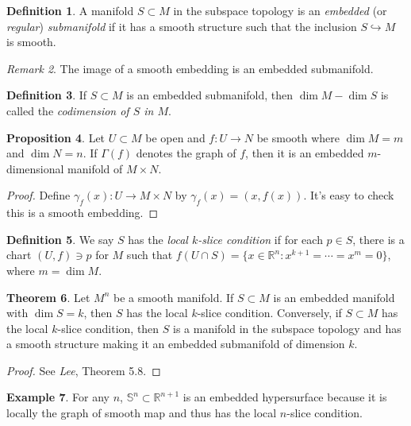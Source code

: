 \documentclass[10pt,letterpaper,cm]{nupset}
\theoremstyle{definition}
\newtheorem{definition}{Definition}[subsection]
\newtheorem{exmp}[definition]{Example}
\theoremstyle{theorem}
\newtheorem{theorem}[definition]{Theorem}
\newtheorem{prop}[definition]{Proposition}
\theoremstyle{remark}
\newtheorem{remark}[definition]{Remark}
\newcommand{\R}{\mathbb R}
\renewcommand{\S}{\mathbb S}
\newcommand{\1}{\mathbf{1}}
\newcommand{\0}{\vec 0}
\begin{document}
\begin{definition}
A manifold $ S\subset M$ in the subspace topology is an \textit{embedded} (or \textit{regular}) \textit{submanifold} if it has a smooth structure such that the inclusion $S \hookrightarrow M$ is smooth.
\end{definition}

\begin{remark}
The image of a smooth embedding is an embedded submanifold.
\end{remark}

\begin{definition}
If $S \subset M$ is an embedded submanifold, then $\dim M - \dim S$ is called the \textit{codimension of $S$ in $M$}.
\end{definition}

\begin{prop}
Let $U \subset M$ be open and $f: U \to N$ be smooth where $\dim M = m$ and $\dim N = n$. If $\Gamma(f)$ denotes the graph of $f$, then it is an embedded $m$-dimensional manifold of $M \times N$.
\end{prop}
\begin{proof}
Define $\gamma_f(x) : U \to M \times N$ by $\gamma_f(x) = (x, f(x))$. It's easy to check this is a smooth embedding.
\end{proof}

\begin{definition}
We say $S$ has the \textit{local $k$-slice condition} if for each $p\in S$, there is a chart $(U, f)\ni p$ for $M$ such that $f(U \cap S) = \{x\in \R^n : x^{k+1} = \cdots = x^m = 0\}$, where $m = \dim M$.
\end{definition}

\begin{theorem}\label{slice}
Let $M^n$ be a smooth manifold. If $S\subset M$ is an embedded manifold with $\dim S = k$, then $S$ has the local $k$-slice condition. Conversely, if $S\subset M$ has the local $k$-slice condition, then $S$ is a manifold in the subspace topology and has a smooth structure making it an embedded submanifold of dimension $k$.
\end{theorem}
\begin{proof}
See \textit{Lee}, Theorem 5.8.
\end{proof}

\begin{exmp}
For any $n$, $\S^n \subset \R^{n+1}$ is an embedded hypersurface because it is locally the graph of smooth map and thus has the local $n$-slice condition.
\end{exmp}
\end{document}
